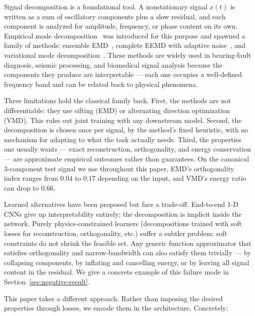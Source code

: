 \documentclass[journal]{IEEEtran}
\begin{document}
Signal decomposition is a foundational tool. A nonstationary signal $x(t)$ is written as a sum of oscillatory components plus a slow residual, and each component is analyzed for amplitude, frequency, or phase content on its own. Empirical mode decomposition~\cite{huang1998} was introduced for this purpose and spawned a family of methods: ensemble EMD~\cite{wu2009eemd}, complete EEMD with adaptive noise~\cite{torres2011ceemdan}, and variational mode decomposition~\cite{vmd2014}. These methods are widely used in bearing-fault diagnosis, seismic processing, and biomedical signal analysis because the components they produce are interpretable --- each one occupies a well-defined frequency band and can be related back to physical phenomena.

Three limitations hold the classical family back. First, the methods are not differentiable: they use sifting (EMD) or alternating direction optimization (VMD). This rules out joint training with any downstream model. Second, the decomposition is chosen once per signal, by the method's fixed heuristic, with no mechanism for adapting to what the task actually needs. Third, the properties one usually wants --- exact reconstruction, orthogonality, and energy conservation --- are approximate empirical outcomes rather than guarantees. On the canonical 3-component test signal we use throughout this paper, EMD's orthogonality index ranges from $0.04$ to $0.17$ depending on the input, and VMD's energy ratio can drop to $0.66$.

Learned alternatives have been proposed but face a trade-off. End-to-end 1-D CNNs give up interpretability entirely; the decomposition is implicit inside the network. Purely physics-constrained learners (decompositions trained with soft losses for reconstruction, orthogonality, etc.) suffer a subtler problem: soft constraints do not shrink the feasible set. Any generic function approximator that satisfies orthogonality and narrow-bandwidth can also satisfy them trivially --- by collapsing components, by inflating and cancelling energy, or by leaving all signal content in the residual. We give a concrete example of this failure mode in Section~\ref{sec:negative-result}.

This paper takes a different approach. Rather than imposing the desired properties through losses, we encode them in the architecture. Concretely:
\end{document}
